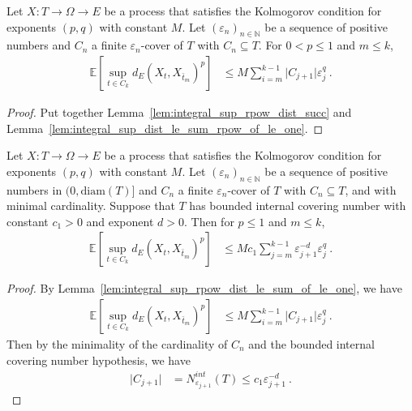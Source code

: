 \begin{lemma}\label{lem:integral_sup_rpow_dist_le_sum_of_le_one}
  \leanok
Let $X : T \to \Omega \to E$ be a process that satisfies the Kolmogorov condition for exponents $(p,q)$ with constant $M$.
Let $(\varepsilon_n)_{n \in \mathbb{N}}$ be a sequence of positive numbers and $C_n$ a finite $\varepsilon_n$-cover of $T$ with $C_n \subseteq T$.
For $0 < p \le 1$ and $m \le k$,
\begin{align*}
  \mathbb{E}\left[\sup_{t \in C_k} d_E(X_t, X_{\bar{t}_m})^p \right]
  &\le M \sum_{i=m}^{k-1} \vert C_{j+1} \vert \varepsilon_j^{q}
  \: .
\end{align*}
\end{lemma}

\begin{proof}\leanok
Put together Lemma~\ref{lem:integral_sup_rpow_dist_succ} and Lemma~\ref{lem:integral_sup_dist_le_sum_rpow_of_le_one}.
\end{proof}


\begin{lemma}\label{lem:integral_sup_rpow_dist_le_of_minimal_cover_of_le_one}
  \leanok
Let $X : T \to \Omega \to E$ be a process that satisfies the Kolmogorov condition for exponents $(p,q)$ with constant $M$.
Let $(\varepsilon_n)_{n \in \mathbb{N}}$ be a sequence of positive numbers in $(0, \mathrm{diam}(T)]$ and $C_n$ a finite $\varepsilon_n$-cover of $T$ with $C_n \subseteq T$, and with minimal cardinality.
Suppose that $T$ has bounded internal covering number with constant $c_1>0$ and exponent $d > 0$.
Then for $p \le 1$ and $m \le k$,
\begin{align*}
  \mathbb{E} \left[\sup_{t \in C_k} d_E(X_t, X_{\bar{t}_m})^p \right]
  &\le M c_1 \sum_{j=m}^{k-1} \varepsilon_{j+1}^{-d} \varepsilon_j^{q}
  \: .
\end{align*}
\end{lemma}

\begin{proof}\leanok
By Lemma~\ref{lem:integral_sup_rpow_dist_le_sum_of_le_one}, we have
\begin{align*}
  \mathbb{E}\left[\sup_{t \in C_k} d_E(X_t, X_{\bar{t}_m})^p \right]
  &\le M \sum_{i=m}^{k-1} \vert C_{j+1} \vert \varepsilon_j^{q}
  \: .
\end{align*}
Then by the minimality of the cardinality of $C_n$ and the bounded internal covering number hypothesis, we have
\begin{align*}
  \vert C_{j+1} \vert
  &= N^{int}_{\varepsilon_{j+1}}(T)
  \le c_1 \varepsilon_{j+1}^{-d}
  \: .
\end{align*}
\end{proof}


